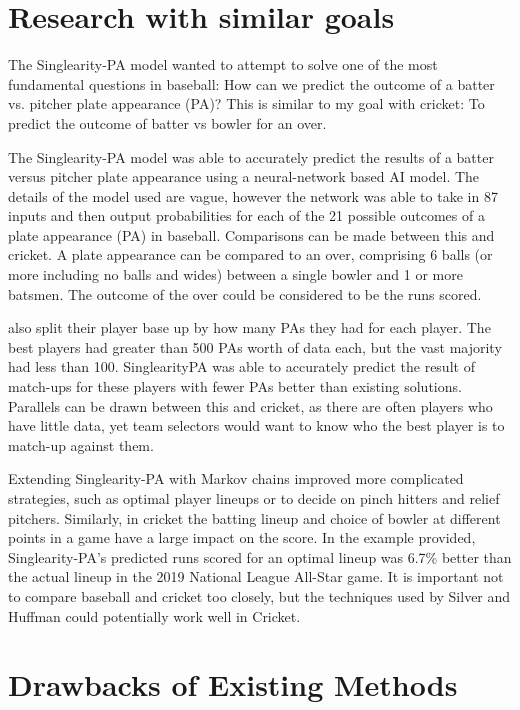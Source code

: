 \documentclass[12pt,a4paper]{report}
\theoremstyle{definition}
\begin{document}
\section{Research with similar goals}

The Singlearity-PA model \citep{silver2021baseball} wanted to attempt to solve one of the most fundamental questions in baseball:	 How can we	predict the outcome of a batter	vs. pitcher plate appearance (PA)? 
This is similar to my goal with cricket:  To predict the outcome of batter vs bowler for an over.

The Singlearity-PA model \citep{silver2021baseball} was able to accurately predict the results of a batter versus pitcher plate appearance using a neural-network based AI model. 
The details of the model used are vague, however the network was able to take in 87 inputs and then output probabilities for each of the 21 possible outcomes of a plate appearance (PA) in baseball. 
Comparisons can be made between this and cricket. 
A plate appearance can be compared to an over, comprising 6 balls (or more including no balls and wides) between a single bowler and 1 or more batsmen. 
The outcome of the over could be considered to be the runs scored. 

\citet{silver2021baseball} also split their player base up by how many PAs they had for each player. 
The best players had greater than 500 PAs worth of data each, but the vast majority had less than 100. 
SinglearityPA was able to accurately predict the result of match-ups for these players with fewer PAs better than existing solutions. 
Parallels can be drawn between this and cricket, as there are often players who have little data, yet team selectors would want to know who the best player is to match-up against them.

Extending Singlearity-PA with Markov chains improved more complicated strategies, such as optimal player lineups or to decide on pinch hitters and relief pitchers. 
Similarly, in cricket the batting lineup and choice of bowler at different points in a game have a large impact on the score. 
In the example provided, Singlearity-PA's predicted runs scored for an optimal lineup was 6.7\% better than the actual lineup in the 2019 National League All-Star game. 
It is important not to compare baseball and cricket too closely, but the techniques used by Silver and Huffman could potentially work well in Cricket.

\section{Drawbacks of Existing Methods}
\end{document}
